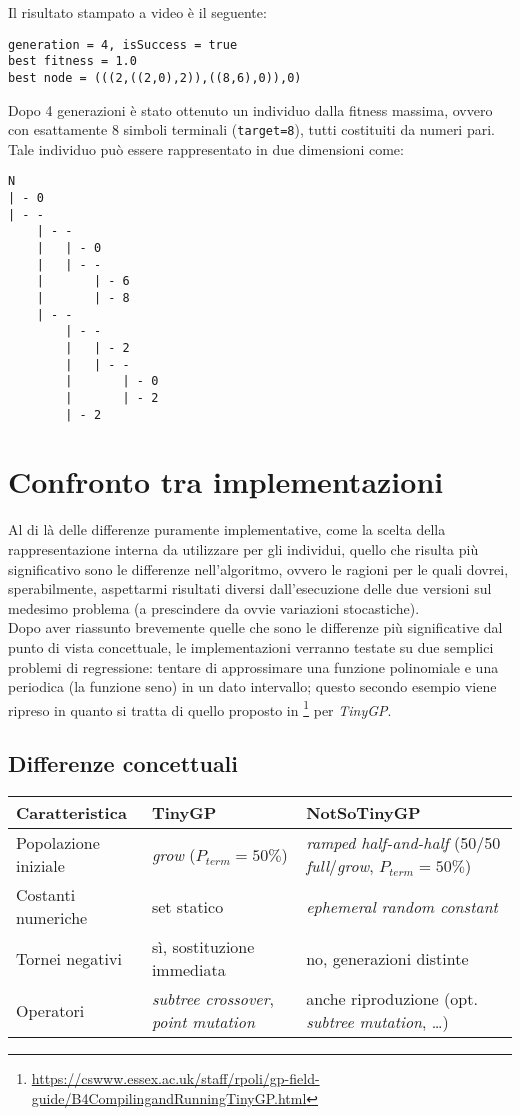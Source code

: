 \documentclass{../llncs}
\begin{document}
\noindent Il risultato stampato a video è il seguente:
\begin{lstlisting}[caption={Output del programma}]
generation = 4, isSuccess = true
best fitness = 1.0
best node = (((2,((2,0),2)),((8,6),0)),0)
\end{lstlisting}
Dopo 4 generazioni è stato ottenuto un individuo dalla fitness massima, ovvero con esattamente 8 simboli terminali (\texttt{target=8}), tutti costituiti da numeri pari. Tale individuo può essere rappresentato in due dimensioni come:
\begin{verbatim}
N
| - 0
| - -
    | - -
    |   | - 0
    |   | - -
    |       | - 6
    |       | - 8
    | - -
        | - -
        |   | - 2
        |   | - -
        |       | - 0
        |       | - 2
        | - 2
\end{verbatim}

\section{Confronto tra implementazioni}
Al di là delle differenze puramente implementative, come la scelta della rappresentazione interna da utilizzare per gli individui, quello che risulta più significativo sono le differenze nell'algoritmo, ovvero le ragioni per le quali dovrei, sperabilmente, aspettarmi risultati diversi dall'esecuzione delle due versioni sul medesimo problema (a prescindere da ovvie variazioni stocastiche).\\

Dopo aver riassunto brevemente quelle che sono le differenze più significative dal punto di vista concettuale, le implementazioni verranno testate su due semplici problemi di regressione: tentare di approssimare una funzione polinomiale e una periodica (la funzione seno) in un dato intervallo; questo secondo esempio viene ripreso in quanto si tratta di quello proposto in \footnote{\url{https://cswww.essex.ac.uk/staff/rpoli/gp-field-guide/B4CompilingandRunningTinyGP.html}} per \emph{TinyGP}.

\subsection{Differenze concettuali}

\begin{table}
\begin{tabular}{l | p{3.7cm} | p{4.3cm}}
\textbf{Caratteristica} & \textbf{TinyGP} & \textbf{NotSoTinyGP} \\ \hline
Popolazione iniziale & \emph{grow} ($P_{term}=50\%$) & \emph{ramped half-and-half} (50/50 \emph{full}/\emph{grow}, $P_{term}=50\%$) \\ \hline
Costanti numeriche & set statico & \emph{ephemeral random constant} \\ \hline
Tornei negativi & sì, sostituzione immediata & no, generazioni distinte \\ \hline
Operatori & \emph{subtree crossover}, \emph{point mutation} & anche riproduzione (opt. \emph{subtree mutation}, \ldots)\\
\end{tabular}
\end{table}
\end{document}
